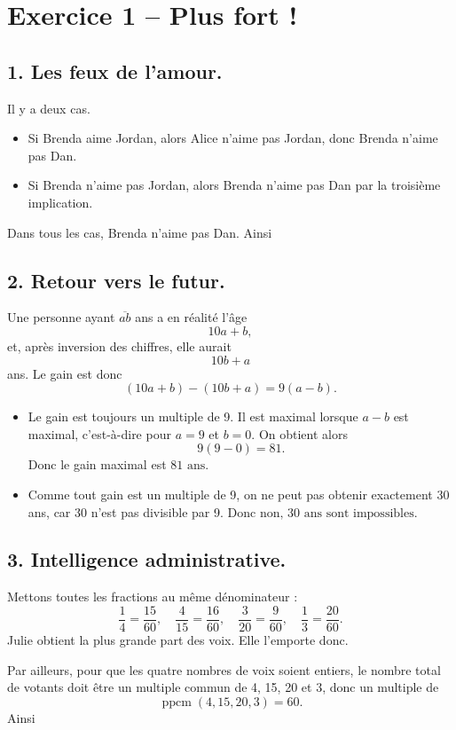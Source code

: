 \section*{Exercice 1 – Plus fort !}

\subsection*{1. Les feux de l'amour.}
Il y a deux cas.
\begin{itemize}
    \item Si Brenda aime Jordan, alors Alice n'aime pas Jordan, donc Brenda n'aime pas Dan.
    \item Si Brenda n'aime pas Jordan, alors Brenda n'aime pas Dan par la troisième implication.
\end{itemize}
Dans tous les cas, Brenda n'aime pas Dan. Ainsi


\subsection*{2. Retour vers le futur.}
Une personne ayant \(\overline{ab}\) ans a en réalité l'âge
\[10a + b,\]
et, après inversion des chiffres, elle aurait
\[10b + a\]
ans. Le gain est donc
\[(10a + b) - (10b + a) = 9(a - b).\]

\begin{itemize}
    \item Le gain est toujours un multiple de 9. Il est maximal lorsque \(a - b\) est maximal, c'est-à-dire pour \(a = 9\) et \(b = 0\). On obtient alors
    \[9(9 - 0) = 81.\]
    Donc le gain maximal est \(\boxed{81\text{ ans}}\).
    \item Comme tout gain est un multiple de 9, on ne peut pas obtenir exactement 30 ans, car 30 n'est pas divisible par 9. Donc \(\boxed{\text{non, 30 ans sont impossibles}}\).
\end{itemize}

\subsection*{3. Intelligence administrative.}
Mettons toutes les fractions au même dénominateur :
\[\frac{1}{4} = \frac{15}{60},\quad \frac{4}{15} = \frac{16}{60},\quad \frac{3}{20} = \frac{9}{60},\quad \frac{1}{3} = \frac{20}{60}.\]
Julie obtient la plus grande part des voix. Elle l'emporte donc.

Par ailleurs, pour que les quatre nombres de voix soient entiers, le nombre total de votants doit être un multiple commun de 4, 15, 20 et 3, donc un multiple de
\[\operatorname{ppcm}(4, 15, 20, 3) = 60.\]
Ainsi

